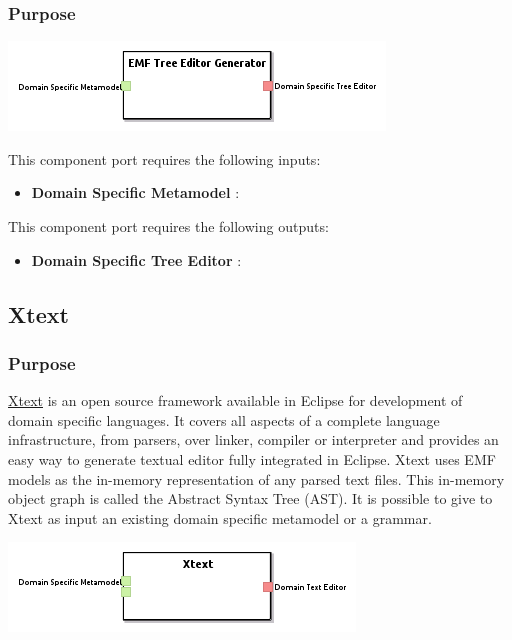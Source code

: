 \documentclass{gemoc} %
\begin{document}
\subsubsection{Purpose}

\begin{center}
\includegraphics*[trim=0.0cm 0.0cm 0cm 0.0cm, clip=true]{../images/generated/Generated_EMF_Tree_Editor_Generator.png}
\end{center}

This component port requires the following inputs:
\begin{itemize}
  \item \textbf{Domain Specific Metamodel} :
\end{itemize}

This component port requires the following outputs:
\begin{itemize}
  \item \textbf{Domain Specific Tree Editor} :
\end{itemize}

\subsection{Xtext}


\subsubsection{Purpose}
\href{http://www.eclipse.org/Xtext}{Xtext} is an open source framework available in Eclipse for development of domain specific languages.
It covers all aspects of a complete language infrastructure, from parsers, over linker, compiler or interpreter and provides an easy way to generate textual editor fully integrated in Eclipse.
Xtext uses EMF models as the in-memory representation of any parsed text files. This in-memory object graph is called the Abstract Syntax Tree (AST).
It is possible to give to Xtext as input an existing domain specific metamodel or a grammar.
\begin{center}
\includegraphics*[trim=0.0cm 0.0cm 0cm 0.0cm, clip=true]{../images/generated/Generated_Xtext.png}
\end{center}
\end{document}
